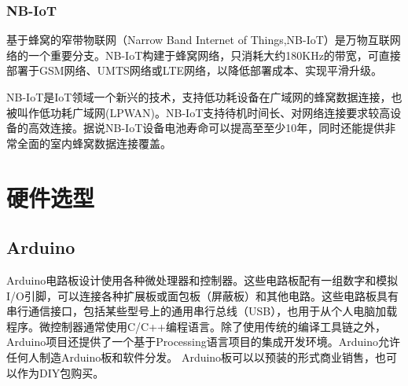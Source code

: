 \documentclass[scheme=chinese,a4paper]{article}
\begin{document}
\subsubsection{NB-IoT}
基于蜂窝的窄带物联网（Narrow Band Internet of Things,NB-IoT）是万物互联网络的一个重要分支。NB-IoT构建于蜂窝网络，只消耗大约180KHz的带宽，可直接部署于GSM网络、UMTS网络或LTE网络，以降低部署成本、实现平滑升级。

NB-IoT是IoT领域一个新兴的技术，支持低功耗设备在广域网的蜂窝数据连接，也被叫作低功耗广域网(LPWAN)。NB-IoT支持待机时间长、对网络连接要求较高设备的高效连接。据说NB-IoT设备电池寿命可以提高至至少10年，同时还能提供非常全面的室内蜂窝数据连接覆盖。
\section{硬件选型}
\subsection{Arduino}
Arduino电路板设计使用各种微处理器和控制器。\cite{wiki:Arduino}这些电路板配有一组数字和模拟I/O引脚，可以连接各种扩展板或面包板（屏蔽板）和其他电路。这些电路板具有串行通信接口，包括某些型号上的通用串行总线（USB），也用于从个人电脑加载程序。微控制器通常使用C/C++编程语言。除了使用传统的编译工具链之外，Arduino项目还提供了一个基于Processing语言项目的集成开发环境。Arduino允许任何人制造Arduino板和软件分发。 Arduino板可以以预装的形式商业销售，也可以作为DIY包购买。
\end{document}
